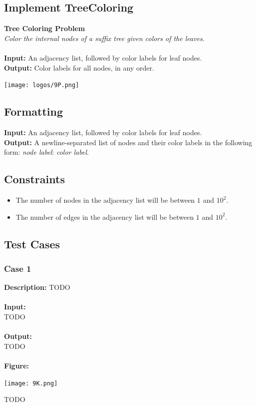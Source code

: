\documentclass{article}
\newcommand{\code}[1]{{\fontfamily{pcr}\selectfont #1}}
\begin{document}
\subsection{Implement TreeColoring}
\hline\vspace{5}
\noindent \textbf{Tree Coloring Problem}\\
\emph{Color the internal nodes of a suffix tree given colors of the leaves}.\\ \\
\textbf{Input:} An adjacency list, followed by color labels for leaf nodes. \\
\textbf{Output:} Color labels for all nodes, in any order.
\begin{center}
    \texttt{[image: logos/9P.png]} 
\end{center}
\hline\vspace{5}

\subsection*{Formatting}
\textbf{Input:} An adjacency list, followed by color labels for leaf nodes.\\
\noindent \textbf{Output:} A newline-separated list of nodes and their color labels in the following form: \emph{node label}: \emph{color label}.

\subsection*{Constraints}
\begin{itemize}
    \item The number of nodes in the adjacency list will be between $1$ and $10^2$.
    \item The number of edges in the adjacency list will be between $1$ and $10^2$.
\end{itemize}
\pagebreak

\subsection*{Test Cases}
\subsubsection*{Case 1}
\hline \vspace{5}
\textbf{Description:} TODO\\ \\
\noindent \textbf{Input:}\\
\code{TODO}\\ \\
\noindent \textbf{Output:}\\
\code{TODO}\\ \\
\noindent \textbf{Figure:}
\begin{center}
    \texttt{[image: 9K.png]}
\end{center}
\noindent TODO
\pagebreak
\end{document}
